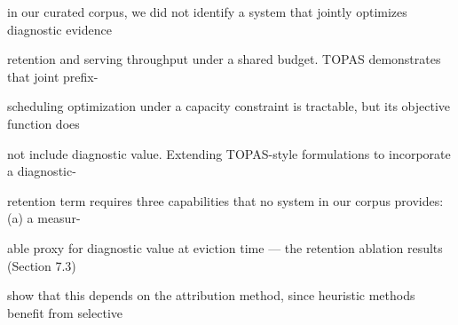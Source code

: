 \begin{flushleft}
\noindent in our curated corpus, we did not identify a system that jointly optimizes diagnostic evidence\par
\noindent retention and serving throughput under a shared budget. TOPAS demonstrates that joint prefix-\par
\noindent scheduling optimization under a capacity constraint is tractable, but its objective function does\par
\noindent not include diagnostic value. Extending TOPAS-style formulations to incorporate a diagnostic-\par
\noindent retention term requires three capabilities that no system in our corpus provides: (a) a measur-\par
\noindent able proxy for diagnostic value at eviction time — the retention ablation results (Section 7.3)\par
\noindent show that this depends on the attribution method, since heuristic methods benefit from selective\par
\end{flushleft}
